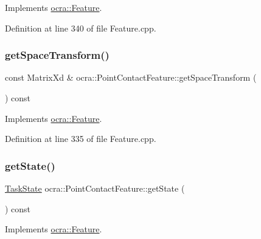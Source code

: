 Implements \hyperlink{classocra_1_1Feature_aeda4c2a5ffe638c3de30f8b91a11450e}{ocra\+::\+Feature}.



Definition at line 340 of file Feature.\+cpp.

\hypertarget{classocra_1_1PointContactFeature_afb64d5566b4e57c7121e88799c15bac6}{}\label{classocra_1_1PointContactFeature_afb64d5566b4e57c7121e88799c15bac6} 
\subsubsection{\texorpdfstring{get\+Space\+Transform()}{getSpaceTransform()}}
{\footnotesize\ttfamily const Matrix\+Xd \& ocra\+::\+Point\+Contact\+Feature\+::get\+Space\+Transform (\begin{DoxyParamCaption}{ }\end{DoxyParamCaption}) const\hspace{0.3cm}{\ttfamily [virtual]}}



Implements \hyperlink{classocra_1_1Feature_a77eb324fb4da91fd50d0e761d2453ff3}{ocra\+::\+Feature}.



Definition at line 335 of file Feature.\+cpp.

\hypertarget{classocra_1_1PointContactFeature_a314df3ffae28a0be71d75317e1f56ab8}{}\label{classocra_1_1PointContactFeature_a314df3ffae28a0be71d75317e1f56ab8} 
\subsubsection{\texorpdfstring{get\+State()}{getState()}}
{\footnotesize\ttfamily \hyperlink{classocra_1_1TaskState}{Task\+State} ocra\+::\+Point\+Contact\+Feature\+::get\+State (\begin{DoxyParamCaption}{ }\end{DoxyParamCaption}) const\hspace{0.3cm}{\ttfamily [virtual]}}



Implements \hyperlink{classocra_1_1Feature_a792434ceb793f25874b8fe42ae24c475}{ocra\+::\+Feature}.



